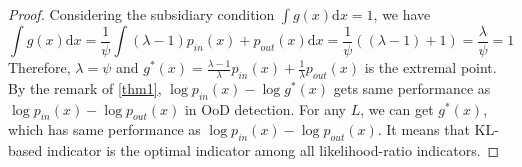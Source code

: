 \documentclass[a3paper]{article}
\newtheorem*{proof}{\it{Proof.}\rm}
\newcommand{\dd}{\mathrm{d}}
\newcommand{\pin}{p_{in}}
\newcommand{\pout}{p_{out}}
\begin{document}
\begin{proof}
	Considering the subsidiary condition $\int g(x) \dd x = 1$, we have
	\begin{equation*}
		\int g(x) \dd x = \frac{1}{\psi} \int (\lambda - 1) \pin(x) + \pout(x) \dd x = \frac{1}{\psi} ((\lambda - 1) + 1) = \frac{\lambda}{\psi} = 1
	\end{equation*}
	Therefore, $\lambda = \psi$ and $g^*(x) = \frac{\lambda - 1}{\lambda} \pin(x) + \frac{1}{\lambda} \pout(x)$ is the extremal point.
	By the remark of \cref{thm1}, $\log \pin(x) - \log g^*(x)$ gets same performance as $\log \pin(x) - \log \pout(x)$ in OoD detection. 
	For any $L$, we can get $g^*(x)$, which has same performance as $\log \pin(x) - \log \pout(x)$. It means that KL-based indicator is the optimal indicator among all likelihood-ratio indicators. 
\end{proof}
\end{document}
